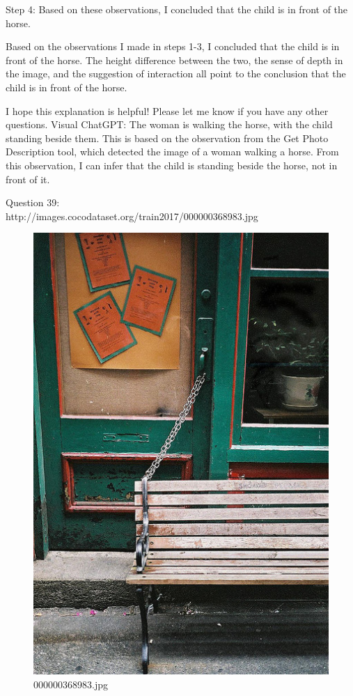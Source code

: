 \begin{enumerate}
        Step 4: Based on these observations, I concluded that the child is in front of the horse.
        
        Based on the observations I made in steps 1-3, I concluded that the child is in front of the horse. The height difference between the two, the sense of depth in the image, and the suggestion of interaction all point to the conclusion that the child is in front of the horse.
        
        I hope this explanation is helpful! Please let me know if you have any other questions.
        \subitem Visual ChatGPT: The woman is walking the horse, with the child standing beside them. This is based on the observation from the Get Photo Description tool, which detected the image of a woman walking a horse. From this observation, I can infer that the child is standing beside the horse, not in front of it.
    \end{enumerate}
    Question 39:\\http://images.cocodataset.org/train2017/000000368983.jpg
    \begin{figure}[h]
        \centering
        \includegraphics[width=0.8\linewidth]{../image set/easy/000000368983.jpg}
        \caption{000000368983.jpg}
    \end{figure}
